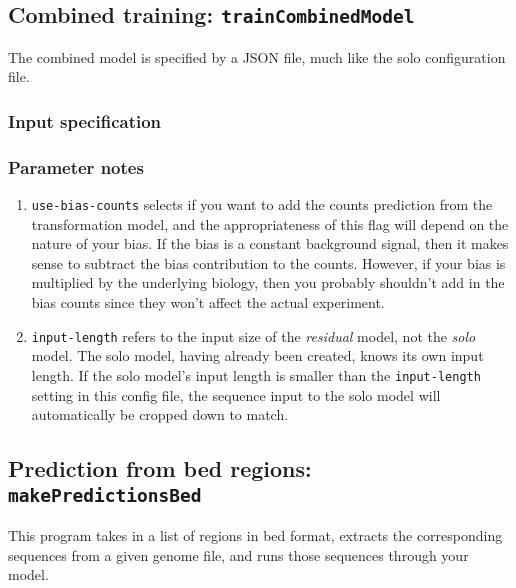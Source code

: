 \documentclass{article}
\begin{document}
\newpage

\subsection{Combined training: \texttt{trainCombinedModel}}\label{prog:trainCombinedModel}

The combined model is specified by a JSON file, much like the solo configuration file.

\subsubsection{Input specification}



\subsubsection{Parameter notes}

\begin{enumerate}
    \item \texttt{use-bias-counts} selects if you want to add the counts prediction from the
        transformation model, and the appropriateness of this flag will depend on the nature
        of your bias.
        If the bias is a constant background signal, then it makes sense to subtract the bias
        contribution to the counts.
        However, if your bias is multiplied by the underlying biology, then you probably
        shouldn't add in the bias counts since they won't affect the actual experiment.
    \item \texttt{input-length} refers to the input size of the \emph{residual} model, not
        the \emph{solo} model.
        The solo model, having already been created, knows its own input length.
        If the solo model's input length is smaller than the \texttt{input-length} setting
        in this config file, the sequence input to the solo model will automatically
        be cropped down to match.
\end{enumerate}




\newpage

\subsection{Prediction from bed regions: \texttt{makePredictionsBed}}\label{prog:makePredictionsBed}

This program takes in a list of regions in bed format, extracts the corresponding sequences from
a given genome file, and runs those sequences through your model.
\end{document}
